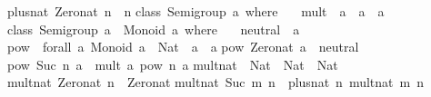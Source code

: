 \begin{isabellebody}
\begin{isamarkuptext}
plus{}nat\ Zero{}nat\ n\ {}\ n{}\isanewline
\isanewline
class\ Semigroup\ a\ where\ {}\isanewline
\ \ mult\ {}{}\ a\ {}{}\ a\ {}{}\ a{}\isanewline
{}{}\isanewline
\isanewline
class\ {}Semigroup\ a{}\ {}{}\ Monoid\ a\ where\ {}\isanewline
\ \ neutral\ {}{}\ a{}\isanewline
{}{}\isanewline
\isanewline
pow\ {}{}\ forall\ a{}\ {}Monoid\ a{}\ {}{}\ Nat\ {}{}\ a\ {}{}\ a{}\isanewline
pow\ Zero{}nat\ a\ {}\ neutral{}\isanewline
pow\ {}Suc\ n{}\ a\ {}\ mult\ a\ {}pow\ n\ a{}{}\isanewline
\isanewline
mult{}nat\ {}{}\ Nat\ {}{}\ Nat\ {}{}\ Nat{}\isanewline
mult{}nat\ Zero{}nat\ n\ {}\ Zero{}nat{}\isanewline
mult{}nat\ {}Suc\ m{}\ n\ {}\ plus{}nat\ n\ {}mult{}nat\ m\ n{}{}\isanewline

\end{isamarkuptext}
\end{isabellebody}
